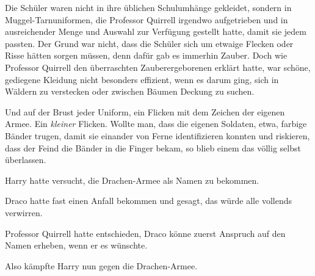Die Schüler waren nicht in ihre üblichen Schulumhänge gekleidet, sondern in Muggel-Tarnuniformen, die Professor Quirrell irgendwo aufgetrieben und in ausreichender Menge und Auswahl zur Verfügung gestellt hatte, damit sie jedem passten. Der Grund war nicht, dass die Schüler sich um etwaige Flecken oder Risse hätten sorgen müssen, denn dafür gab es immerhin Zauber. Doch wie Professor Quirrell den überraschten Zauberergeborenen erklärt hatte, war schöne, gediegene Kleidung nicht besonders effizient, wenn es darum ging, sich in Wäldern zu verstecken oder zwischen Bäumen Deckung zu suchen.

Und auf der Brust jeder Uniform, ein Flicken mit dem Zeichen der eigenen Armee. Ein \emph{kleiner} Flicken. Wollte man, dass die eigenen Soldaten, etwa, farbige Bänder trugen, damit sie einander von Ferne identifizieren konnten und riskieren, dass der Feind die Bänder in die Finger bekam, so blieb einem das völlig selbst überlassen.

Harry hatte versucht, die Drachen-Armee als Namen zu bekommen.

Draco hatte fast einen Anfall bekommen und gesagt, das würde alle vollends verwirren.

Professor Quirrell hatte entschieden, Draco könne zuerst Anspruch auf den Namen erheben, wenn er es wünschte.

Also kämpfte Harry nun gegen die Drachen-Armee.%

